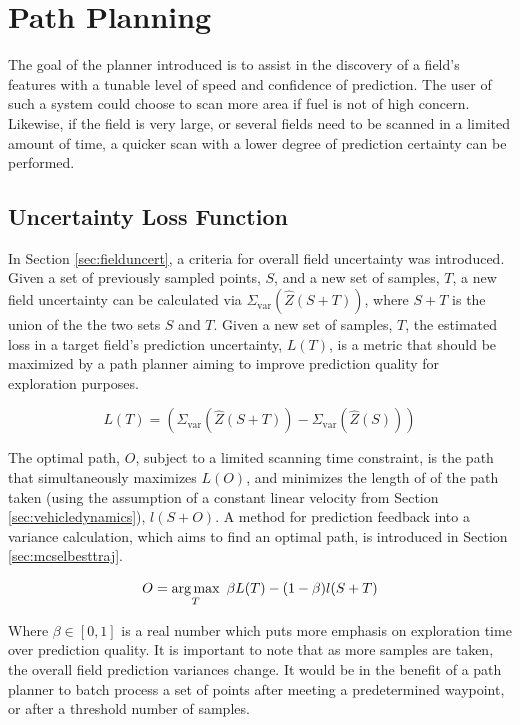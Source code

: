 \chapter{Path Planning} \label{ch:pp}
The goal of the planner introduced is to assist in the discovery of a field's features with a tunable level of speed and confidence of prediction. The user of such a system could choose to scan more area if fuel is not of high concern. Likewise, if the field is very large, or several fields need to be scanned in a limited amount of time, a quicker scan with a lower degree of prediction certainty can be performed.

\section{Uncertainty Loss Function} \label{sec:lossfunc}
In Section \ref{sec:fielduncert}, a criteria for overall field uncertainty was introduced. Given a set of previously sampled points, $S$, and a new set of samples, $T$, a new field uncertainty can be calculated via $\Sigma_{\text{var}}(\hat{Z}(S + T))$, where $S + T$ is the union of the the two sets $S$ and $T$. Given a new set of samples, $T$, the estimated loss in a target field's prediction uncertainty, $L(T)$, is a metric that should be maximized by a path planner aiming to improve prediction quality for exploration purposes.

\begin{equation}
	L(T) = (\Sigma_{\text{var}}(\hat{Z}(S+T)) - \Sigma_{\text{var}}(\hat{Z}(S)))
	\label{eq:lossfunc}
\end{equation}

The optimal path, $O$, subject to a limited scanning time constraint, is the path that simultaneously maximizes $L(O)$, and minimizes the length of of the path taken (using the assumption of a constant linear velocity from Section \ref{sec:vehicledynamics}), $l(S + O)$. A method for prediction feedback into a variance calculation, which aims to find an optimal path, is introduced in Section \ref{sec:mcselbesttraj}.

\begin{equation}
	O = \operatorname*{arg\,max}_T\ \beta L(T) - (1-\beta)l(S + T)
\end{equation}

Where $\beta \in [0,1]$ is a real number which puts more emphasis on exploration time over prediction quality. It is important to note that as more samples are taken, the overall field prediction variances change. It would be in the benefit of a path planner to batch process a set of points after meeting a predetermined waypoint, or after a threshold number of samples. 

